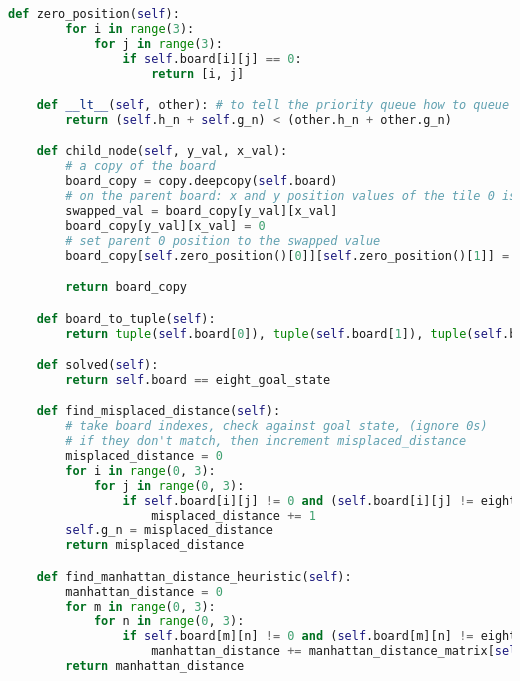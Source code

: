 \documentclass{article}
\begin{document}
\begin{lstlisting}[language=python]
    def zero_position(self):
        for i in range(3):
            for j in range(3):
                if self.board[i][j] == 0:
                    return [i, j]

    def __lt__(self, other): # to tell the priority queue how to queue
        return (self.h_n + self.g_n) < (other.h_n + other.g_n)

    def child_node(self, y_val, x_val):
        # a copy of the board
        board_copy = copy.deepcopy(self.board)
        # on the parent board: x and y position values of the tile 0 is being swapped with
        swapped_val = board_copy[y_val][x_val]
        board_copy[y_val][x_val] = 0
        # set parent 0 position to the swapped value
        board_copy[self.zero_position()[0]][self.zero_position()[1]] = swapped_val

        return board_copy

    def board_to_tuple(self):
        return tuple(self.board[0]), tuple(self.board[1]), tuple(self.board[2])

    def solved(self):
        return self.board == eight_goal_state

    def find_misplaced_distance(self):
        # take board indexes, check against goal state, (ignore 0s)
        # if they don't match, then increment misplaced_distance
        misplaced_distance = 0
        for i in range(0, 3):
            for j in range(0, 3):
                if self.board[i][j] != 0 and (self.board[i][j] != eight_goal_state[i][j]):
                    misplaced_distance += 1
        self.g_n = misplaced_distance
        return misplaced_distance

    def find_manhattan_distance_heuristic(self):
        manhattan_distance = 0
        for m in range(0, 3):
            for n in range(0, 3):
                if self.board[m][n] != 0 and (self.board[m][n] != eight_goal_state[m][n]):
                    manhattan_distance += manhattan_distance_matrix[self.board[m][n] - 1][eight_goal_state[m][n] - 1]
        return manhattan_distance

  \end{lstlisting}
\end{document}
